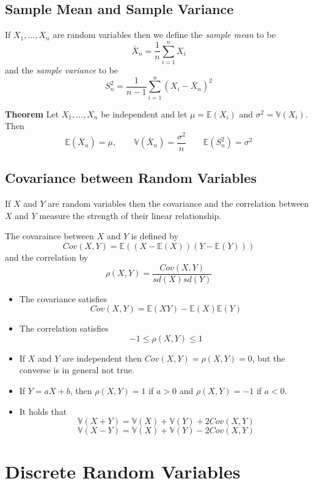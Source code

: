 \documentclass[
]{book}
\providecommand{\tightlist}{%
  \setlength{\itemsep}{0pt}\setlength{\parskip}{0pt}}
\theoremstyle{definition}
\theoremstyle{definition}
\theoremstyle{definition}
\theoremstyle{definition}
\theoremstyle{remark}
\begin{document}
\hypertarget{sample-mean-and-sample-variance}{%
\subsection{Sample Mean and Sample Variance}\label{sample-mean-and-sample-variance}}

If \(X_1,\dots,X_n\) are random variables then we define the \emph{sample mean} to be
\[
\bar{X}_n=\frac{1}{n}\sum_{i=1}^n X_i
\]
and the \emph{sample variance} to be
\[
S_n^2=\frac{1}{n-1}\sum_{i=1}^n(X_i-\bar{X}_n)^2
\]

\textbf{Theorem} Let \(X_1,\dots, X_n\) be independent and let \(\mu=\mathbb{E}(X_i)\) and \(\sigma^2=\mathbb{V}(X_i)\). Then
\[
\mathbb{E}(\bar{X}_n)=\mu, \qquad \mathbb{V}(\bar{X}_n)=\frac{\sigma^2}{n} \qquad \mathbb{E}(S_n^2)=\sigma^2
\]

\hypertarget{covariance-between-random-variables}{%
\subsection{Covariance between Random Variables}\label{covariance-between-random-variables}}

If \(X\) and \(Y\) are random variables then the covariance and the correlation between \(X\) and \(Y\) measure the strength of their linear relationship.

The covaraince between \(X\) and \(Y\) is defined by
\[
Cov(X,Y)=\mathbb{E}\left((X-\mathbb{E}(X))(Y-\mathbb{E}(Y))\right)
\]
and the correlation by
\[
\rho(X,Y)=\frac{Cov(X,Y)}{sd(X)sd(Y)}
\]

\begin{itemize}
\tightlist
\item
  The covariance satisfies
  \[
  Cov(X,Y)=\mathbb{E}(XY)-\mathbb{E}(X)\mathbb{E}(Y)
  \]
\item
  The correlation satisfies
  \[
  -1\leq \rho(X,Y)\leq 1
  \]
\item
  If \(X\) and \(Y\) are independent then \(Cov(X,Y)=\rho(X,Y)=0\), but the converse is in general not true.
\item
  If \(Y=aX+b\), then \(\rho(X,Y)=1\) if \(a>0\) and \(\rho(X,Y)=-1\) if \(a<0\).
\item
  It holds that
  \[
  \mathbb{V}(X+Y)=\mathbb{V}(X)+\mathbb{V}(Y)+2Cov(X,Y)
  \]
  \[
  \mathbb{V}(X-Y)=\mathbb{V}(X)+\mathbb{V}(Y)-2Cov(X,Y)
  \]
\end{itemize}

\hypertarget{discrete-random-variables-1}{%
\section{Discrete Random Variables}\label{discrete-random-variables-1}}
\end{document}
